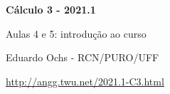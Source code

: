 \documentclass[oneside,12pt]{article}
\begin{document}


%
%

\def\drafturl{http://angg.twu.net/LATEX/2021-1-C3.pdf}
\def\drafturl{http://angg.twu.net/2021.1-C3.html}
\def\draftfooter{\tiny \href{\drafturl}{\jobname{}} \ColorBrown{\shorttoday{} \hours}}



%

\thispagestyle{empty}

\begin{center}

\vspace*{1.2cm}

{\bf \Large Cálculo 3 - 2021.1}

\bsk

Aulas 4 e 5: introdução ao curso

\bsk

Eduardo Ochs - RCN/PURO/UFF

\url{http://angg.twu.net/2021.1-C3.html}

\end{center}

\newpage
\end{document}

